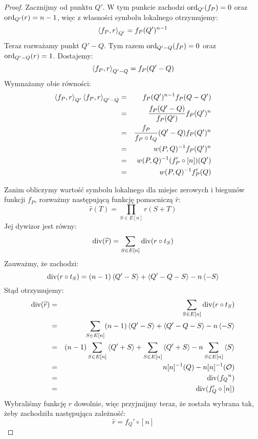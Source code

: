 \begin{proof}
\noindent
Zacznijmy od punktu $Q'$. W tym punkcie zachodzi
$\operatorname{ord}_{Q'}(f_P) = 0$ oraz $\operatorname{ord}_{Q'}(r) = n-1$,
więc z własności symbolu lokalnego otrzymujemy:
\begin{equation*}
\left\langle f_P , r \right\rangle_{Q'} = f_P(Q')^{n-1}
\end{equation*}
Teraz rozważamy punkt $Q' - Q$.
Tym razem $\operatorname{ord}_{Q' - Q}(f_P) = 0$ oraz $\operatorname{ord}_{Q' - Q}(r) = 1$.
Dostajemy:
\begin{equation*}
\left\langle f_P , r \right\rangle_{Q' - Q} = f_P(Q' - Q)
\end{equation*}
Wymnażamy obie równości:
\begin{eqnarray*}
\left\langle f_P , r \right\rangle_{Q'}\left\langle f_P , r \right\rangle_{Q' - Q}
& = & f_P(Q')^{n-1} f_P(Q - Q') \\
& = & \frac{f_P(Q' - Q)}{f_P(Q')} f_P(Q')^n \\
& = & \frac{f_P}{f_P \circ t_Q}(Q' - Q) f_P(Q')^n \\
& = & w(P,Q)^{-1} f_P(Q')^n \\
& = & w(P,Q)^{-1} (f_P' \circ [n])(Q') \\
& = & w(P,Q)^{-1} f_P'(Q)
\end{eqnarray*}

\noindent
Zanim obliczymy wartość symbolu lokalnego
dla miejsc zerowych i biegunów funkcji $f_P$,
rozważmy następującą funkcję pomocniczą $\widehat{r}$:
\begin{equation*}
\widehat{r}(T) = \prod_{S \in E[n]} r(S + T)
\end{equation*}
Jej dywizor jest równy:
\begin{equation*}
\operatorname{div}(\widehat{r}) = \sum_{S \in E[n]} \operatorname{div}(r \circ t_S)
\end{equation*}
Zauważmy, że zachodzi:
\begin{equation*}
\operatorname{div}(r \circ t_S) = (n-1)\left\langle Q' - S\right\rangle + \left\langle Q' - Q - S\right\rangle - n\left\langle-S\right\rangle
\end{equation*}
Stąd otrzymujemy:
\begin{eqnarray*}
\operatorname{div}(\widehat{r})
& = & \sum_{S \in E[n]} \operatorname{div}(r \circ t_S) \\
& = & \sum_{S \in E[n]} (n-1)\left\langle Q' - S\right\rangle + \left\langle Q' - Q - S\right\rangle - n\left\langle-S\right\rangle \\
& = & (n-1)\sum_{S \in E[n]}\left\langle Q' + S\right\rangle +
      \sum_{S \in E[n]}\left\langle Q' + S\right\rangle -
      n\sum_{S \in E[n]}\left\langle S\right\rangle \\
& = & n[n]^{-1}(Q) - n[n]^{-1}(\mathcal{O}) \\
& = & \operatorname{div}({f_Q}^n) \\
& = & \operatorname{div}(f_Q' \circ [n])
\end{eqnarray*}
Wybraliśmy funkcję $r$ dowolnie, więc przyjmijmy teraz,
że została wybrana tak, żeby zachodziła następująca zależność:
\begin{equation*}
\widehat{r} = f_Q' \circ [n]
\end{equation*}


\end{proof}
